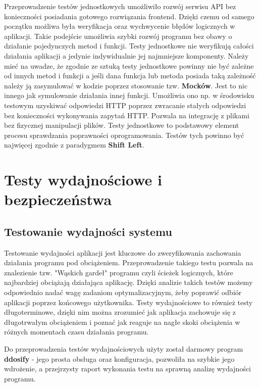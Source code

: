 Przeprowadzenie testów jednostkowych umożliwiło rozwój serwisu API bez konieczności posiadania gotowego rozwiązania frontend. Dzięki czemu od samego początku możliwa była weryfikacja oraz wychwycenie błędów logicznych w aplikacji. Takie podejście umożliwia szybki rozwój programu bez obawy o działanie pojedynczych metod i funkcji. Testy jednostkowe nie weryfikują całości działania aplikacji a jedynie indywidualnie jej najmniejsze komponenty. Należy mieć na uwadze, że zgodnie ze sztuką testy jednostkowe powinny nie być zależne od innych metod i funkcji a jeśli dana funkcja lub metoda posiada taką zależność należy ją zasymulować w kodzie poprzez stosowanie tzw. \textbf{Mocków}. Jest to nic innego jak symulowanie działania innej funkcji. Umożliwia ono np. w środowisku testowym uzyskiwać odpowiedzi HTTP poprzez zwracanie stałych odpowiedzi bez konieczności wykonywania zapytań HTTP. Pozwala na integrację z plikami bez fizycznej manipulacji plików. Testy jednostkowe to podstawowy element procesu sprawdzania poprawności oprogramowania. Testów tych powinno być najwięcej zgodnie z paradygmem \textbf{Shift Left}.

\section{Testy wydajnościowe i bezpieczeństwa}
\subsection{Testowanie wydajności systemu}

Testowanie wydajności aplikacji jest kluczowe do zweryfikowania zachowania działania programu pod obciążeniem. Przeprowadzenie takiego testu pozwala na znalezienie tzw. "Wąskich gardeł" programu czyli ścieżek logicznych, które najbardziej obciążają działająca aplikację. Dzięki analizie takich testów możemy odpowiednio nadać wagę zadaniom optymalizacyjnym, żeby poprawić odbiór aplikacji poprzez końcowego użytkownika. Testy wydajnościowe to również testy długoterminowe, dzięki nim można zrozumieć jak aplikacja zachowuje się z długotrwałym obciążeniem i poznać jak reaguje na nagłe skoki obciążenia w różnych momentach czasu działania programu.

Do przeprowadzenia testów wydajnościowych użyty został darmowy program \textbf{ddosify} - jego prosta obsługa oraz konfiguracja, pozwoliła na szybkie jego wdrożenie, a przejrzysty raport wykonania testu na sprawną analizę wydajności programu. 


